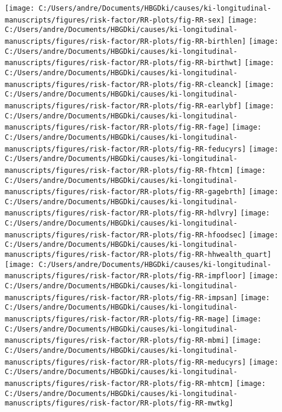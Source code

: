 \documentclass[
  9pt,
]{book}
\begin{document}
\texttt{[image: C:/Users/andre/Documents/HBGDki/causes/ki-longitudinal-manuscripts/figures/risk-factor/RR-plots/fig-RR-sex]}
\texttt{[image: C:/Users/andre/Documents/HBGDki/causes/ki-longitudinal-manuscripts/figures/risk-factor/RR-plots/fig-RR-birthlen]}
\texttt{[image: C:/Users/andre/Documents/HBGDki/causes/ki-longitudinal-manuscripts/figures/risk-factor/RR-plots/fig-RR-birthwt]}
\texttt{[image: C:/Users/andre/Documents/HBGDki/causes/ki-longitudinal-manuscripts/figures/risk-factor/RR-plots/fig-RR-cleanck]}
\texttt{[image: C:/Users/andre/Documents/HBGDki/causes/ki-longitudinal-manuscripts/figures/risk-factor/RR-plots/fig-RR-earlybf]}
\texttt{[image: C:/Users/andre/Documents/HBGDki/causes/ki-longitudinal-manuscripts/figures/risk-factor/RR-plots/fig-RR-fage]}
\texttt{[image: C:/Users/andre/Documents/HBGDki/causes/ki-longitudinal-manuscripts/figures/risk-factor/RR-plots/fig-RR-feducyrs]}
\texttt{[image: C:/Users/andre/Documents/HBGDki/causes/ki-longitudinal-manuscripts/figures/risk-factor/RR-plots/fig-RR-fhtcm]}
\texttt{[image: C:/Users/andre/Documents/HBGDki/causes/ki-longitudinal-manuscripts/figures/risk-factor/RR-plots/fig-RR-gagebrth]}
\texttt{[image: C:/Users/andre/Documents/HBGDki/causes/ki-longitudinal-manuscripts/figures/risk-factor/RR-plots/fig-RR-hdlvry]}
\texttt{[image: C:/Users/andre/Documents/HBGDki/causes/ki-longitudinal-manuscripts/figures/risk-factor/RR-plots/fig-RR-hfoodsec]}
\texttt{[image: C:/Users/andre/Documents/HBGDki/causes/ki-longitudinal-manuscripts/figures/risk-factor/RR-plots/fig-RR-hhwealth\_quart]}
\texttt{[image: C:/Users/andre/Documents/HBGDki/causes/ki-longitudinal-manuscripts/figures/risk-factor/RR-plots/fig-RR-impfloor]}
\texttt{[image: C:/Users/andre/Documents/HBGDki/causes/ki-longitudinal-manuscripts/figures/risk-factor/RR-plots/fig-RR-impsan]}
\texttt{[image: C:/Users/andre/Documents/HBGDki/causes/ki-longitudinal-manuscripts/figures/risk-factor/RR-plots/fig-RR-mage]}
\texttt{[image: C:/Users/andre/Documents/HBGDki/causes/ki-longitudinal-manuscripts/figures/risk-factor/RR-plots/fig-RR-mbmi]}
\texttt{[image: C:/Users/andre/Documents/HBGDki/causes/ki-longitudinal-manuscripts/figures/risk-factor/RR-plots/fig-RR-meducyrs]}
\texttt{[image: C:/Users/andre/Documents/HBGDki/causes/ki-longitudinal-manuscripts/figures/risk-factor/RR-plots/fig-RR-mhtcm]}
\texttt{[image: C:/Users/andre/Documents/HBGDki/causes/ki-longitudinal-manuscripts/figures/risk-factor/RR-plots/fig-RR-mwtkg]}
\end{document}

